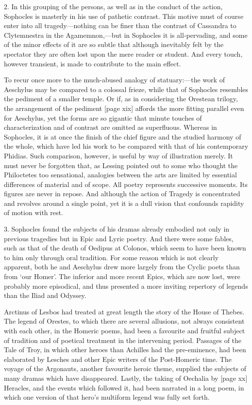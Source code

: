 \documentclass[11pt,letter]{book}
\begin{document}
\par  2. In this grouping of the persons, as well as in the conduct of the action, Sophocles is masterly in his use of pathetic contrast. This motive must of course enter into all tragedy—nothing can be finer than the contrast of Cassandra to Clytemnestra in the Agamemnon,—but in Sophocles it is all-pervading, and some of the minor effects of it are so subtle that although inevitably felt by the spectator they are often lost upon the mere reader or student. And every touch, however transient, is made to contribute to the main effect.

\par  To recur once more to the much-abused analogy of statuary:—the work of Aeschylus may be compared to a colossal frieze, while that of Sophocles resembles the pediment of a smaller temple. Or if, as in considering the Orestean trilogy, the arrangement of the pediment [page xix] affords the more fitting parallel even for Aeschylus, yet the forms are so gigantic that minute touches of characterization and of contrast are omitted as superfluous. Whereas in Sophocles, it is at once the finish of the chief figure and the studied harmony of the whole, which have led his work to be compared with that of his contemporary Phidias. Such comparison, however, is useful by way of illustration merely. It must never be forgotten that, as Lessing pointed out to some who thought the Philoctetes too sensational, analogies between the arts are limited by essential differences of material and of scope. All poetry represents successive moments. Its figures are never in repose. And although the action of Tragedy is concentrated and revolves around a single point, yet it is a dull vision that confounds rapidity of motion with rest.

\par  3. Sophocles found the subjects of his dramas already embodied not only in previous tragedies but in Epic and Lyric poetry. And there were some fables, such as that of the death of Oedipus at Colonos, which seem to have been known to him only through oral tradition. For some reason which is not clearly apparent, both he and Aeschylus drew more largely from the Cyclic poets than from ‘our Homer’. The inferior and more recent Epics, which are now lost, were probably more episodical, and thus presented a more inviting repertory of legends than the Iliad and Odyssey.

\par  Arctinus of Lesbos had treated at great length the story of the House of Thebes. The legend of Orestes, to which there are several allusions, not always consistent with each other, in the Homeric poems, had been a favourite and fruitful subject of tradition and of poetical treatment in the intervening period. Passages of the Tale of Troy, in which other heroes than Achilles had the pre-eminence, had been elaborated by Lesches and other Epic writers of the Post-Homeric time. The voyage of the Argonauts, another favourite heroic theme, supplied the subjects of many dramas which have disappeared. Lastly, the taking of Oechalia by [page xx] Heracles, and the events which followed it, had been narrated in a long poem, in which one version of that hero’s multiform legend was fully set forth.
\end{document}
